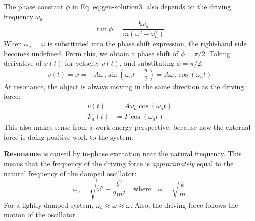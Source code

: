 The phase constant $\phi$ in Eq.\ref{eq:gen-solution3} also depends on the
driving frequency $\omega_a$.
\begin{equation}
  \boxed{\tan\phi=\frac{b\omega_a}{m(\omega^2-\omega_a^2)}}
\end{equation}
When $\omega_a=\omega$ is substituted into the phase shift expression, the
right-hand side becomes undefined. From this, we obtain a phase shift of
$\phi=\pi/2$. Taking derivative of $x(t)$ for velocity $v(t)$, and
substituting $\phi=\pi/2$:
\begin{equation}
  v(t)=\dot x
  =-A\omega_a\sin(\omega_a t-\frac{\pi}2)
  =A\omega_a\cos(\omega_a t)
\end{equation}
At resonance, the object is always moving in the same direction as the
driving force:
\begin{align*}
  v(t)&=A\omega_a\cos(\omega_a t)\\
  F_a(t)&=F\cos(\omega_a t)
\end{align*}
This also makes sense from a work-energy perspective, because now the
external force is doing positive work to the system.

\textbf{Resonance} is caused by in-phase excitation near the natural
frequency. This means that the frequency of the driving force is
\emph{approximately} equal to the natural frequency of the damped oscillator:
\begin{equation}
  \omega_a=\sqrt{\omega^2-\frac{b^2}{2m^2}}
  \quad\text{where}\quad\omega=\sqrt{\frac km}
\end{equation}
For a lightly damped system, $\omega_a\approx\omega\approx\omega$. Also, the
driving force follows the motion of the oscillator.
